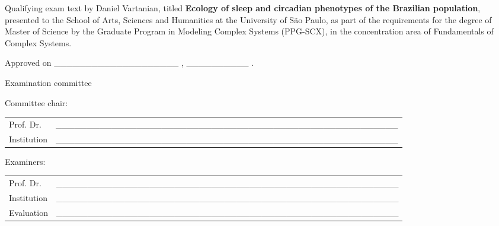\documentclass[
  12pt,
  a4paper,
  oneside]{tesesusp}
\begin{document}

\begin{folhadeaprovacao}
  \noindent
Qualifying exam text by Daniel Vartanian, titled \textbf{Ecology of
sleep and circadian phenotypes of the Brazilian population}, presented
to the School of Arts, Sciences and Humanities at the University of São
Paulo, as part of the requirements for the degree of Master of Science
by the Graduate Program in Modeling Complex Systems (PPG-SCX), in the
concentration area of Fundamentals of Complex Systems.

  \vspace*{1.5cm}

  \noindent
  Approved on \_\_\_\_\_\_\_\_\_\_\_\_\_\_\_\_\_\_\_\_ , \_\_\_\_\_\_\_\_\_\_ .

  \vspace*{1.5cm}

  \begin{center}
    \noindent Examination committee
  \end{center}

  \vspace*{0.5cm}

  \noindent Committee chair:

  \vspace*{0.25cm}

  \renewcommand{\arraystretch}{2}
  \setlength{\arrayrulewidth}{0pt}
  \setlength{\tabcolsep}{0pt}
  \noindent
  \begin{tabular}{m{2cm} P{14cm}}
    Prof. Dr. & \_\_\_\_\_\_\_\_\_\_\_\_\_\_\_\_\_\_\_\_\_\_\_\_\_\_\_\_\_\_\_\_\_\_\_\_\_\_\_\_\_\_\_\_\_\_\_\_\_\_\_\_\_\_\_ \\
    Institution & \_\_\_\_\_\_\_\_\_\_\_\_\_\_\_\_\_\_\_\_\_\_\_\_\_\_\_\_\_\_\_\_\_\_\_\_\_\_\_\_\_\_\_\_\_\_\_\_\_\_\_\_\_\_\_ \\
  \end{tabular}

  \vspace*{1cm}

  \noindent Examiners:

  \vspace*{0.25cm}

  \noindent
  \begin{tabular}{m{2cm} P{14cm}}
    Prof. Dr. & \_\_\_\_\_\_\_\_\_\_\_\_\_\_\_\_\_\_\_\_\_\_\_\_\_\_\_\_\_\_\_\_\_\_\_\_\_\_\_\_\_\_\_\_\_\_\_\_\_\_\_\_\_\_\_ \\
    Institution & \_\_\_\_\_\_\_\_\_\_\_\_\_\_\_\_\_\_\_\_\_\_\_\_\_\_\_\_\_\_\_\_\_\_\_\_\_\_\_\_\_\_\_\_\_\_\_\_\_\_\_\_\_\_\_ \\
    Evaluation & \_\_\_\_\_\_\_\_\_\_\_\_\_\_\_\_\_\_\_\_\_\_\_\_\_\_\_\_\_\_\_\_\_\_\_\_\_\_\_\_\_\_\_\_\_\_\_\_\_\_\_\_\_\_\_ \\
  \end{tabular}


\end{folhadeaprovacao}
\end{document}
